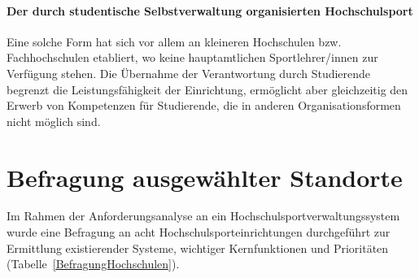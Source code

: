 \paragraph*{Der durch studentische Selbstverwaltung organisierten Hochschulsport}
Eine solche Form hat sich vor allem an kleineren Hochschulen bzw. Fachhochschulen etabliert, wo keine hauptamtlichen Sportlehrer/innen zur Verfügung stehen. Die Übernahme der Verantwortung durch Studierende begrenzt die Leistungsfähigkeit der Einrichtung, ermöglicht aber gleichzeitig den Erwerb von Kompetenzen für Studierende, die in anderen Organisationsformen nicht möglich sind. 

\section{Befragung ausgewählter Standorte}
Im Rahmen der Anforderungsanalyse an ein Hochschulsportverwaltungssystem wurde eine Befragung an acht Hochschulsporteinrichtungen durchgeführt zur Ermittlung existierender Systeme, wichtiger Kernfunktionen und Prioritäten (Tabelle~\ref{BefragungHochschulen}).

